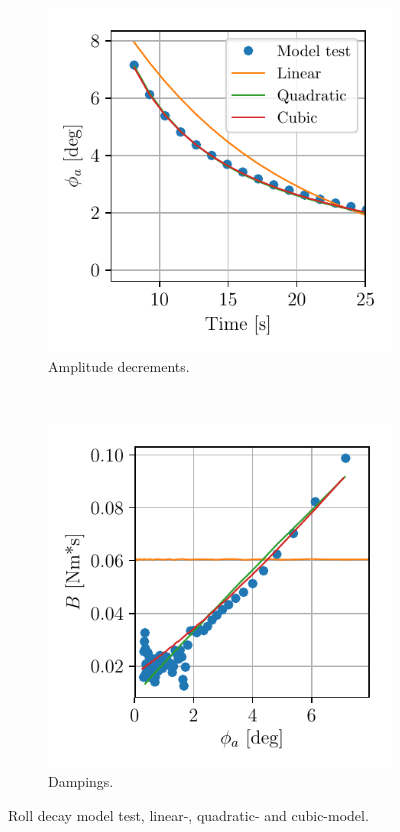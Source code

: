 \begin{figure}[h!]
    \begin{subfigure}[b]{0.45\textwidth}
        \centering
        \includegraphics[width=0.9\linewidth]{kappa/images/roll_decay_amplitude.pdf}
        \caption{Amplitude decrements.}
        \label{fig:roll_decay_amplitude}
    \end{subfigure}
        ~ %
    \begin{subfigure}[b]{0.45\textwidth}
        \centering
        \includegraphics[width=0.9\linewidth]{kappa/images//roll_decay_damping.pdf}
        \caption{Dampings.}
        \label{fig:roll_decay_damping}
    \end{subfigure}
    \caption{Roll decay model test, linear-, quadratic- and cubic-model.}
    \label{fig:roll_decay}
\end{figure}

